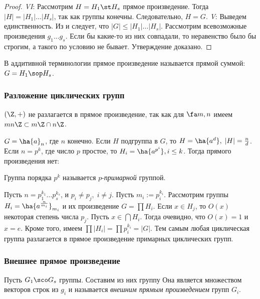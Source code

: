 \documentclass[a4paper]{article}
\begin{document}
\begin{proof}
\emph{VI}: Рассмотрим $H= H_1 \st H_s$ прямое произведение. Тогда $|H|=|H_1|\ldots|H_s|$, так как
группы конечны. Следовательно, $H=G$. \emph{V}: Выведем единственность. Из  и  следует, что
$|G| \le |H_1|\ldots|H_s|$. Рассмотрим всевозможные произведения $g_1 \ldots g_s$. Если бы какие-то из них
совпадали, то неравенство было бы строгим, а такого по условию не бывает. Утверждение доказано.
\end{proof}

В аддитивной терминологии прямое произведение называется прямой суммой: $G = H_1 \sop H_s$.

\subsubsection{Разложение циклических групп}

\begin{ex}
$(\Z,+)$ не разлагается в прямое произведение, так как для $\fa m,n$ имеем $mn\Z \subset m\Z \cap n\Z$.
\end{ex}

\begin{ex}
$G = \ha{a}_n$, где $n$ конечно. Если $H$ подгруппа в $G$, то $H=\ha{a^d}, \; |H| = \frac{n}{d}$. Если
$n = p^k$, где число $p$ простое, то $H_i = \ha{a^{p^i}}, i \le k$. Тогда прямого произведения нет:
\end{ex}

\begin{df}
Группа порядка $p^k$ называется $p$-\emph{примарной} группой.
\end{df}

Пусть $n=p_1^{k_1} \ldots p_s^{k_s}$, и $p_i \neq p_j, \; i \neq j$. Пусть $m_i:= p_i^{k_i}$. Рассмотрим
группы $H_i=\ha{a^\frac{n}{m_i}}_{m_i}$ и их произведение $G= \prod H_i$. Если $x \in H_j$, то $O(x)$
некоторая степень числа $p_j$. Пусть $x \in \bigcap H_i$. Тогда  очевидно, что $O(x)=1$ и $x=e$. Кроме того,
имеем $\prod |H_i| = \prod p_i^{k_i}=|G|$. Тем самым любая циклическая группа разлагается в прямое
произведение примарных циклических групп.

\subsubsection{Внешнее прямое произведение}

\begin{df}
Пусть $G_1 \sco G_s$ группы. Составим из них группу
Она является множеством векторов строк из $g_i$ и называется \emph{внешним прямым произведением} групп $G_i$.
\end{df}
\end{document}
